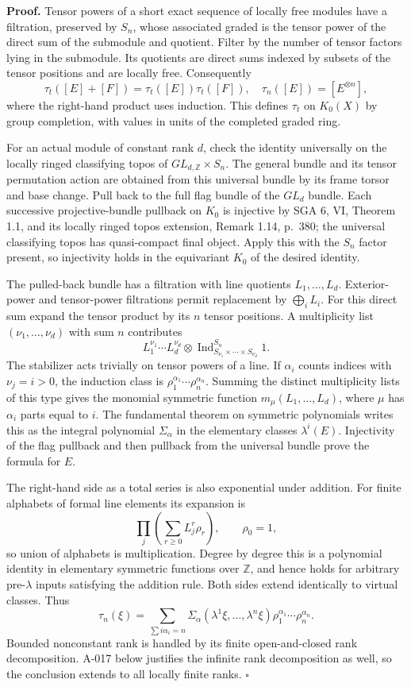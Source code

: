 \documentclass[11pt]{article}
\begin{document}
\textbf{Proof.} Tensor powers of a short exact sequence of locally
free modules have a filtration, preserved by $S_n$, whose associated
graded is the tensor power of the direct sum of the submodule and
quotient. Filter by the number of tensor factors lying in the submodule.
Its quotients are direct sums indexed by subsets of the tensor positions
and are locally free. Consequently
\[
 \tau_t([E]+[F])=\tau_t([E])\tau_t([F]),
 \quad \tau_n([E])=[E^{\otimes n}],
\]
where the right-hand product uses induction. This defines $\tau_t$
on $K_0(X)$ by group completion, with values in units of the completed
graded ring.

For an actual module of constant rank $d$, check the identity
universally on the locally ringed classifying topos of
$GL_{d,\mathbb Z}\times S_n$. The general bundle and its tensor
permutation action are obtained from this universal bundle by its frame
torsor and base change. Pull back to the full flag bundle of the
$GL_d$ bundle. Each successive projective-bundle pullback on $K_0$
is injective by SGA 6, VI, Theorem 1.1, and its locally ringed topos
extension, Remark 1.14, p.~380; the universal classifying topos has
quasi-compact final object. Apply this with the $S_n$ factor present,
so injectivity holds in the equivariant $K_0$ of the desired identity.

The pulled-back bundle has a filtration with line quotients
$L_1,\ldots,L_d$. Exterior-power and tensor-power filtrations permit
replacement by $\bigoplus_iL_i$. For this direct sum expand the
tensor product by its $n$ tensor positions. A multiplicity list
$(\nu_1,\ldots,\nu_d)$ with sum $n$ contributes
\[
 L_1^{\nu_1}\cdots L_d^{\nu_d}\otimes
 \operatorname{Ind}_{S_{\nu_1}\times\cdots\times S_{\nu_d}}^{S_n}1.
\]
The stabilizer acts trivially on tensor powers of a line. If
$\alpha_i$ counts indices with $\nu_j=i>0$, the induction class is
$\rho_1^{\alpha_1}\cdots\rho_n^{\alpha_n}$. Summing the distinct
multiplicity lists of this type gives the monomial symmetric function
$m_\mu(L_1,\ldots,L_d)$, where $\mu$ has $\alpha_i$ parts equal
to $i$. The fundamental theorem on symmetric polynomials writes this
as the integral polynomial $\Sigma_\alpha$ in the elementary classes
$\lambda^i(E)$. Injectivity of the flag pullback and then pullback
from the universal bundle prove the formula for $E$.

The right-hand side as a total series is also exponential under
addition. For finite alphabets of formal line elements its expansion is
\[
 \prod_j\left(\sum_{r\geq0}L_j^r\rho_r\right),\qquad\rho_0=1,
\]
so union of alphabets is multiplication. Degree by degree this is a
polynomial identity in elementary symmetric functions over $\mathbb Z$,
and hence holds for arbitrary pre-$\lambda$ inputs satisfying the
addition rule. Both sides extend identically to virtual classes. Thus
\[
 \tau_n(\xi)=\sum_{\sum i\alpha_i=n}
 \Sigma_\alpha(\lambda^1\xi,\ldots,\lambda^n\xi)
              \rho_1^{\alpha_1}\cdots\rho_n^{\alpha_n}.
\]
Bounded nonconstant rank is handled by its finite open-and-closed rank
decomposition. A-017 below justifies the infinite rank decomposition
as well, so the conclusion extends to all locally finite ranks.
\hfill$\square$
\end{document}
